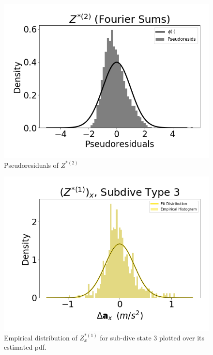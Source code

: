 \begin{figure}[ht]
	\centering
	\includegraphics[width=5in]{../Plots/psedoresids_ahat.png}
	\caption{Pseudoresiduals of $Z^{*(2)}$}
	\label{fig:pseudoresids}
\end{figure}

\begin{figure}[ht]
	\centering
	\includegraphics[width=5in]{../Plots/empirical_hist_Ax_2.png}
	\caption{Empirical distribution of $Z^{*(1)}_x$ for sub-dive state 3 plotted over its estimated pdf.}
	\label{fig:empirical_dist}
\end{figure}